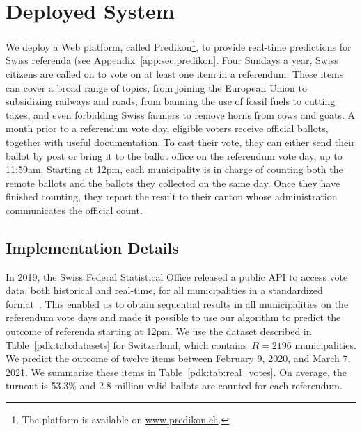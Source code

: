 \section{Deployed System}%
\label{pdk:sec:depsys}

We deploy a Web platform, called Predikon\footnote{The platform is available on \href{http://www.predikon.ch}{www.predikon.ch}.}, to provide real-time predictions for Swiss referenda (see Appendix~\ref{app:sec:predikon}.
Four Sundays a year, Swiss citizens are called on to vote on at least one item in a referendum.
These items can cover a broad range of topics, from joining the European Union to subsidizing railways and roads, from banning the use of fossil fuels to cutting taxes, and even forbidding Swiss farmers to remove horns from cows and goats.
A month prior to a referendum vote day, eligible voters receive official ballots, together with useful documentation.
To cast their vote, they can either send their ballot by post or bring it to the ballot office on the referendum vote day, up to 11:59am.
Starting at 12pm, each municipality is in charge of counting both the remote ballots and the ballots they collected on the same day.
Once they have finished counting, they report the result to their canton whose administration communicates the official count.

\subsection{Implementation Details}

In 2019, the Swiss Federal Statistical Office released a public API to access vote data, both historical and real-time, for all municipalities in a standardized format~\cite{confederation2020open}.
This enabled us to obtain sequential results in all municipalities on the referendum vote days and made it possible to use our algorithm to predict the outcome of referenda starting at 12pm.
We use the dataset described in Table~\ref{pdk:tab:datasets} for Switzerland, which contains~$R = 2196$ municipalities.
We predict the outcome of twelve items between February 9, 2020, and March 7, 2021.
We summarize these items in Table~\ref{pdk:tab:real_votes}.
On average, the turnout is 53.3\% and 2.8 million valid ballots are counted for each referendum.

